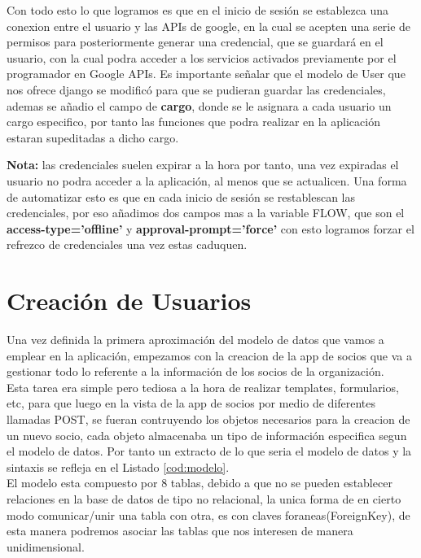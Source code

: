 Con todo esto lo que logramos es que en el inicio de sesión se establezca una conexion entre el usuario y las APIs de google, en la cual se acepten una serie de permisos para posteriormente generar una credencial,
que se guardará en el usuario, con la cual podra acceder a los servicios activados previamente por el programador en Google APIs. Es importante señalar que el modelo de User que nos ofrece django se modificó para que
se pudieran guardar las credenciales, ademas se añadio el campo de \textbf{cargo}, donde se le asignara a cada usuario un cargo especifico, por tanto las funciones que podra realizar en la aplicación estaran supeditadas a dicho cargo.

\textbf{Nota:} las credenciales suelen expirar a la hora por tanto, una vez expiradas el usuario no podra acceder a la aplicación, al menos que se actualicen. Una forma de automatizar esto es que en cada inicio de sesión
se restablescan las credenciales, por eso añadimos dos campos mas a la variable FLOW, que son el \textbf{access-type='offline'} y \textbf{approval-prompt='force'} con esto logramos forzar el refrezco de
credenciales una vez estas caduquen.


\section{Creación de Usuarios}
\label{4:sec5}

Una vez definida la primera aproximación del modelo de datos que vamos a emplear en la aplicación, empezamos con la creacion de la app de socios que va a gestionar todo lo referente a la información de los socios de 
la organización.\\

Esta tarea era simple pero tediosa a la hora de realizar templates, formularios, etc, para que luego en la vista de la app de socios por medio de diferentes llamadas POST, se fueran contruyendo los objetos necesarios
para la creacion de un nuevo socio, cada objeto almacenaba un tipo de información especifica segun el modelo de datos. Por tanto un extracto de lo que seria el modelo de datos y la sintaxis se refleja en el Listado \ref{cod:modelo}.\\



El modelo esta compuesto por 8 tablas, debido a que no se pueden establecer relaciones en la base de datos de tipo no relacional, la unica forma de en cierto modo comunicar/unir una tabla con otra,
es con claves foraneas(ForeignKey), de esta manera podremos asociar las tablas que nos interesen de manera unidimensional.\\

